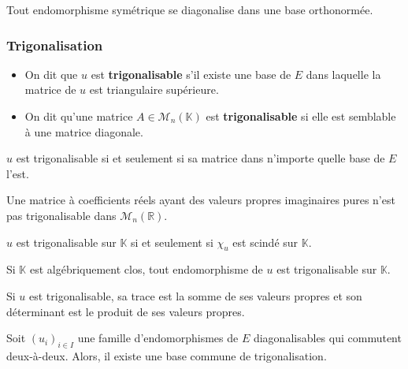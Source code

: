 	
	\begin{theorem}[Spectral]
		Tout endomorphisme symétrique se diagonalise dans une base orthonormée.
	\end{theorem}
	
	\subsubsection{Trigonalisation}
	
	
	\begin{definition}
		\begin{itemize}
			\item On dit que $u$ est \textbf{trigonalisable} s'il existe une base de $E$ dans laquelle la matrice de $u$ est triangulaire supérieure.
			\item On dit qu'une matrice $A \in \mathcal{M}_n(\mathbb{K})$ est \textbf{trigonalisable} si elle est semblable à une matrice diagonale.
		\end{itemize}
	\end{definition}
	
	\begin{remark}
		$u$ est trigonalisable si et seulement si sa matrice dans n'importe quelle base de $E$ l'est.
	\end{remark}
	
	\begin{example}
		Une matrice à coefficients réels ayant des valeurs propres imaginaires pures n'est pas trigonalisable dans $\mathcal{M}_n(\mathbb{R})$.
	\end{example}
	
	\begin{theorem}
		$u$ est trigonalisable sur $\mathbb{K}$ si et seulement si $\chi_u$ est scindé sur $\mathbb{K}$.
	\end{theorem}
	
	\begin{corollary}
		Si $\mathbb{K}$ est algébriquement clos, tout endomorphisme de $u$ est trigonalisable sur $\mathbb{K}$.
	\end{corollary}
	
	\begin{proposition}
		Si $u$ est trigonalisable, sa trace est la somme de ses valeurs propres et son déterminant est le produit de ses valeurs propres.
	\end{proposition}
	
	\begin{theorem}
		Soit $(u_i)_{i \in I}$ une famille d'endomorphismes de $E$ diagonalisables qui commutent deux-à-deux. Alors, il existe une base commune de trigonalisation.
	\end{theorem}
	

